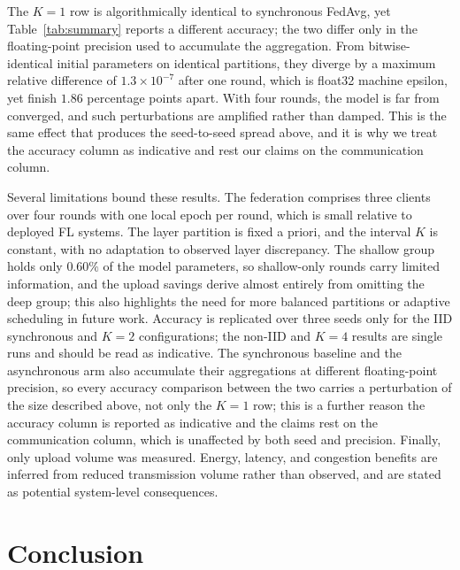 \documentclass[10pt,conference]{IEEEtran}
\begin{document}
The $K=1$ row is algorithmically identical to synchronous FedAvg, yet Table~\ref{tab:summary} reports a different accuracy; the two differ only in the floating-point precision used to accumulate the aggregation. From bitwise-identical initial parameters on identical partitions, they diverge by a maximum relative difference of $1.3 \times 10^{-7}$ after one round, which is float32 machine epsilon, yet finish $1.86$ percentage points apart. With four rounds, the model is far from converged, and such perturbations are amplified rather than damped. This is the same effect that produces the seed-to-seed spread above, and it is why we treat the accuracy column as indicative and rest our claims on the communication column.

Several limitations bound these results. The federation comprises three clients over four rounds with one local epoch per round, which is small relative to deployed FL systems. The layer partition is fixed a priori, and the interval $K$ is constant, with no adaptation to observed layer discrepancy. The shallow group holds only $0.60\%$ of the model parameters, so shallow-only rounds carry limited information, and the upload savings derive almost entirely from omitting the deep group; this also highlights the need for more balanced partitions or adaptive scheduling in future work. Accuracy is replicated over three seeds only for the IID synchronous and $K=2$ configurations; the non-IID and $K=4$ results are single runs and should be read as indicative. The synchronous baseline and the asynchronous arm also accumulate their aggregations at different floating-point precision, so every accuracy comparison between the two carries a perturbation of the size described above, not only the $K=1$ row; this is a further reason the accuracy column is reported as indicative and the claims rest on the communication column, which is unaffected by both seed and precision. Finally, only upload volume was measured. Energy, latency, and congestion benefits are inferred from reduced transmission volume rather than observed, and are stated as potential system-level consequences.



\section{Conclusion}
\end{document}
